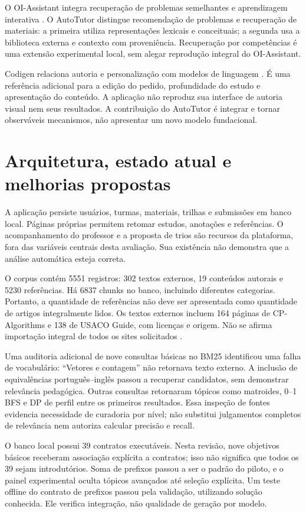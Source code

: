 \documentclass[12pt]{article}
\begin{document}
O OI-Assistant integra recuperação de problemas semelhantes e aprendizagem interativa \cite{su2025}. O AutoTutor distingue recomendação de problemas e recuperação de materiais: a primeira utiliza representações lexicais e conceituais; a segunda usa a biblioteca externa e contexto com proveniência. Recuperação por competências é uma extensão experimental local, sem alegar reprodução integral do OI-Assistant.

Codigen relaciona autoria e personalização com modelos de linguagem \cite{codigen2025}. É uma referência adicional para a edição do pedido, profundidade do estudo e apresentação do conteúdo. A aplicação não reproduz sua interface de autoria visual nem seus resultados. A contribuição do AutoTutor é integrar e tornar observáveis mecanismos, não apresentar um novo modelo fundacional.

\section{Arquitetura, estado atual e melhorias propostas}
A aplicação persiste usuários, turmas, materiais, trilhas e submissões em banco local. Páginas próprias permitem retomar estudos, anotações e referências. O acompanhamento do professor e a proposta de trios são recursos da plataforma, fora das variáveis centrais desta avaliação. Sua existência não demonstra que a análise automática esteja correta.

O corpus contém 5551 registros: 302 textos externos, 19 conteúdos autorais e 5230 referências. Há 6837 chunks no banco, incluindo diferentes categorias. Portanto, a quantidade de referências não deve ser apresentada como quantidade de artigos integralmente lidos. Os textos externos incluem 164 páginas de CP-Algorithms e 138 de USACO Guide, com licenças e origem. Não se afirma importação integral de todos os sites solicitados \cite{cpalgorithms2026,usaco2026}.

Uma auditoria adicional de nove consultas básicas no BM25 identificou uma falha de vocabulário: ``Vetores e contagem'' não retornava texto externo. A inclusão de equivalências português--inglês passou a recuperar candidatos, sem demonstrar relevância pedagógica. Outras consultas retornaram tópicos como matroides, 0--1 BFS e DP de perfil entre os primeiros resultados. Essa inspeção de fontes evidencia necessidade de curadoria por nível; não substitui julgamentos completos de relevância nem autoriza calcular precisão e recall.

O banco local possui 39 contratos executáveis. Nesta revisão, nove objetivos básicos receberam associação explícita a contratos; isso não significa que todos os 39 sejam introdutórios. Soma de prefixos passou a ser o padrão do piloto, e o painel experimental oculta tópicos avançados até seleção explícita. Um teste offline do contrato de prefixos passou pela validação, utilizando solução conhecida. Ele verifica integração, não qualidade de geração por modelo.
\end{document}

